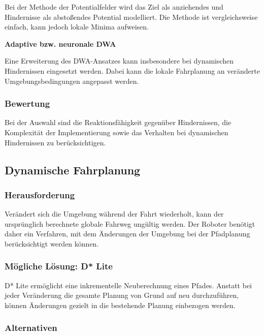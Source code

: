 Bei der Methode der Potentialfelder wird das Ziel als anziehendes und
Hindernisse als abstoßendes Potential modelliert. Die Methode ist
vergleichsweise einfach, kann jedoch lokale Minima aufweisen.

\textbf{Adaptive bzw. neuronale DWA}

Eine Erweiterung des DWA-Ansatzes kann insbesondere bei dynamischen
Hindernissen eingesetzt werden. Dabei kann die lokale Fahrplanung an
veränderte Umgebungsbedingungen angepasst werden.

\subsubsection{Bewertung}\label{bewertung-1}

Bei der Auswahl sind die Reaktionsfähigkeit gegenüber Hindernissen, die
Komplexität der Implementierung sowie das Verhalten bei dynamischen
Hindernissen zu berücksichtigen.

\subsection{Dynamische Fahrplanung}\label{dynamische-fahrplanung}

\subsubsection{Herausforderung}\label{herausforderung-2}

Verändert sich die Umgebung während der Fahrt wiederholt, kann der
ursprünglich berechnete globale Fahrweg ungültig werden. Der Roboter
benötigt daher ein Verfahren, mit dem Änderungen der Umgebung bei der
Pfadplanung berücksichtigt werden können.

\subsubsection{Mögliche Lösung: D*
Lite}\label{muxf6gliche-luxf6sung-d-lite}

D* Lite ermöglicht eine inkrementelle Neuberechnung eines Pfades.
Anstatt bei jeder Veränderung die gesamte Planung von Grund auf neu
durchzuführen, können Änderungen gezielt in die bestehende Planung
einbezogen werden.

\subsubsection{Alternativen}\label{alternativen-2}

